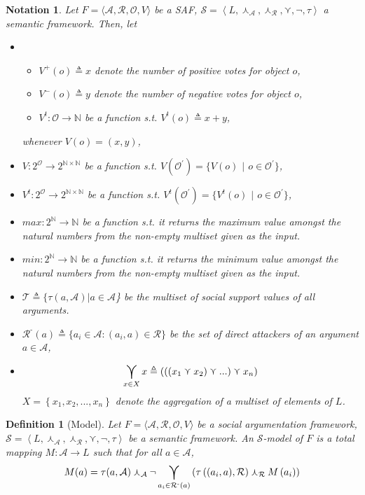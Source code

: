 \documentclass{article}
\newtheorem{definition}{Definition}
\newtheorem{notation}{Notation}
\newcommand{\nat}{\mathbb{N}}   %
\newcommand{\real}{\mathbb{R}}  %
\newcommand{\args}{\mathcal{A}} %
\newcommand{\att}{\mathcal{R}}  %
\newcommand{\valueset}{L}
\newcommand{\obj}{\mathcal{O}} %
\newcommand{\attackers}[1]{\att^\text{-}\left(#1\right)}
\newcommand{\safid}{F}               %
\newcommand{\safbodyO}{\langle \args, \att, \obj, V \rangle} %
\newcommand{\safO}{\safid = \safbodyO} %
\newcommand{\semid}{\mathcal{S}}        %
\newcommand{\sembodyNew}{\left\langle \valueset,\SAFand_\mathcal{A}, \SAFand_\mathcal{R},\SAFor,\lnot,\tau \right\rangle} %
\newcommand{\SAFand}{\curlywedge}     %
\newcommand{\SAFor}{\curlyvee}        %
\DeclareMathOperator*{\SAFOr}{\bigcurlyvee} %
\newcommand{\sem}{\mathcal{S}}
\newcommand{\ssset}{\mathcal{T}}   %
\begin{document}
\begin{notation}
Let $\safO$ be a SAF, $\sem = \sembodyNew$ a semantic framework. Then, let
\begin{itemize}
\item
\begin{itemize}
\item $V^{+} (o) \triangleq x$ denote the number of positive votes for object $o$,
\item $V^{-} (o) \triangleq y$ denote the number of negative votes for object $o$,
\item $V^t: \obj \to \nat$ be a function s.t. $V^t(o) \triangleq x + y$,  
\end{itemize}
whenever $V(o) = (x, y)$,
\\
\item $V: 2^\obj \to 2^{\nat \times \nat}$ be a function s.t. $V(\mathcal{O}^{'}) = \{V(o)$ $|$ $o \in \mathcal{O}^{'}\}$,
\item $V^{t}: 2^\obj \to 2^{\nat \times \nat}$ be a function s.t. $V^t(\mathcal{O}^{'}) = \{V^t(o)$ $|$ $o \in \mathcal{O}^{'}\}$,
\item $max: 2^{\nat} \to \nat$ be a function s.t. it returns the maximum value amongst the natural numbers from the non-empty multiset given as the input.
\item $min: 2^{\nat} \to \nat$ be a function s.t. it returns the minimum value amongst the natural numbers from the non-empty multiset given as the input.
\item  $\ssset \triangleq \{\tau(a, \args) | a \in \args$\} be the multiset of social support values of all arguments.
\item $\attackers{a} \triangleq \{a_i \in \args: (a_i, a) \in \att\}$ be the set of direct attackers of an argument $a \in \args$, 
\item$$\SAFOr_{x \in X} x \triangleq\left(\left(\left(  x_{1}\SAFor x_{2}\right) \SAFor...\right)\SAFor x_{n}\right)$$ $X=\left\{  x_{1},x_{2},...,x_{n}\right\}$ denote the aggregation of a multiset of elements of $\valueset$. 
\end{itemize}
\end{notation}

\begin{definition}[Model] 
\label{def:model}
  Let $\safO$ be a social argumentation framework, $\sem = \sembodyNew$ be a semantic framework. An $\semid$-model of $\safid$ is a total mapping $M : \args \rightarrow \valueset$ such that for all $a \in \args$,
  $$\displaystyle M(a) = \tau(a, \args ) \SAFand_\args \lnot \SAFOr_{a_i \in \attackers{a}} \left(\tau\left((a_i, a), \att \right) \SAFand_\att M\left(a_i\right)\right)$$
\end{definition}
\end{document}
